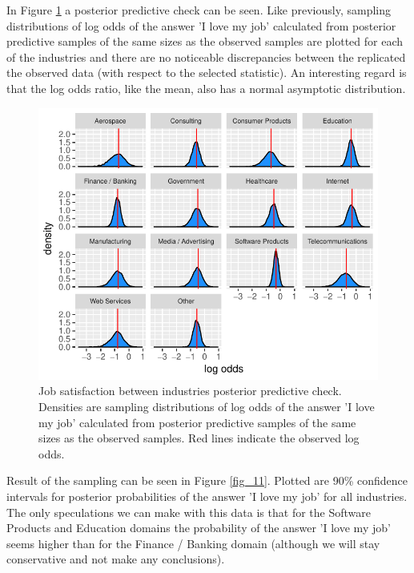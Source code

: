 \documentclass{article}
\begin{document}
In Figure \ref{fig_10} a posterior predictive check can be seen. Like previously, sampling distributions of log odds of the answer 'I love my job' calculated from posterior predictive samples of the same sizes as the observed samples are plotted for each of the industries and there are no noticeable discrepancies between the replicated the observed data (with respect to the selected statistic). An interesting regard is that the log odds ratio, like the mean, also has a normal asymptotic distribution.





\begin{figure}[H]
\centering
\includegraphics{report-036}
\caption{Job satisfaction between industries posterior predictive check. Densities are sampling distributions of log odds of the answer 'I love my job' calculated from posterior predictive samples of the same sizes as the observed samples. Red lines indicate the observed log odds.}\label{fig_10}
\end{figure}

Result of the sampling can be seen in Figure \ref{fig_11}. Plotted are 90\% confidence intervals for posterior probabilities of the answer 'I love my job' for all industries. The only speculations we can make with this data is that for the Software Products and Education domains the probability of the answer 'I love my job' seems higher than for the Finance / Banking domain (although we will stay conservative and not make any conclusions).
\end{document}

